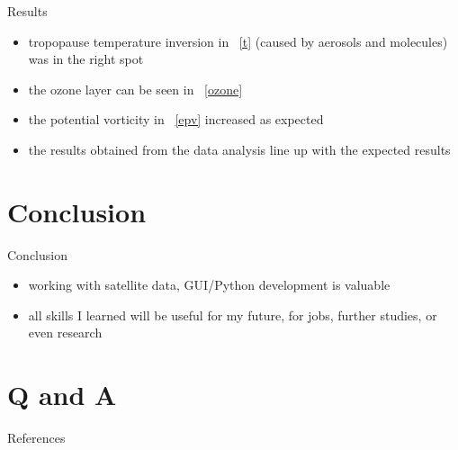 \documentclass[
    hyperref={
        final,
        colorlinks=true,
        menucolor=black,
        anchorcolor=green,
        linkcolor=blue,
        citecolor=red,
        pdftitle={RS RAS Internship Presentation},
        pdfauthor={Moritz M. Konarski}
    }
]{beamer}
\newcommand{\figref}[1]{\figurename~\ref{#1}}
\begin{document}
\begin{frame}{Results}
    \begin{itemize}
        \item tropopause temperature inversion in \figref{t} (caused by 
            aerosols and molecules) \cite{inversion} was in the right spot
        \item the ozone layer can be seen in \figref{ozone}
        \item the potential vorticity in \figref{epv} increased as expected
        \item the results obtained from the data analysis line up with the
            expected results
    \end{itemize}
\end{frame}

\section{Conclusion}

\begin{frame}{Conclusion}
    \begin{itemize}
        \item working with satellite data, GUI/Python development is valuable
        \item all skills I learned will be useful for my future, for jobs,
            further studies, or even research
    \end{itemize}
\end{frame}

\section{Q and A}

\tiny
\begin{frame}[allowframebreaks]{References}
    
    
\end{frame}
\end{document}

